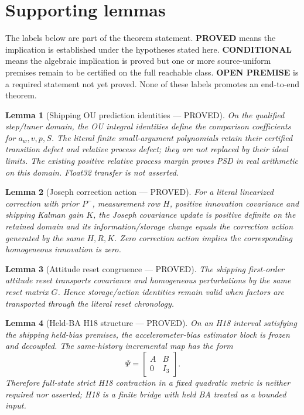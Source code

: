 \documentclass[journal]{IEEEtran}
\newtheorem{lemma}{Lemma}\newtheorem{theorem}{Theorem}\newtheorem{proposition}{Proposition}\newtheorem{remark}{Remark}\newtheorem{corollary}{Corollary}
\begin{document}
\section{Supporting lemmas}
The labels below are part of the theorem statement.  \textbf{PROVED} means the implication is established under the hypotheses stated here. \textbf{CONDITIONAL} means the algebraic implication is proved but one or more source-uniform premises remain to be certified on the full reachable class. \textbf{OPEN PREMISE} is a required statement not yet proved.  None of these labels promotes an end-to-end theorem.

\begin{lemma}[Shipping OU prediction identities --- PROVED]
On the qualified step/tuner domain, the OU integral identities define the comparison coefficients for \(a_w,v,p,S\). The literal finite small-argument polynomials retain their certified transition defect and relative process defect; they are not replaced by their ideal limits. The existing positive relative process margin proves PSD in real arithmetic on this domain. Float32 transfer is not asserted.
\end{lemma}

\begin{lemma}[Joseph correction action --- PROVED]
For a literal linearized correction with prior \(P^-\), measurement row \(H\), positive innovation covariance and shipping Kalman gain \(K\), the Joseph covariance update is positive definite on the retained domain and its information/storage change equals the correction action generated by the same \(H,R,K\).  Zero correction action implies the corresponding homogeneous innovation is zero.
\end{lemma}

\begin{lemma}[Attitude reset congruence --- PROVED]
The shipping first-order attitude reset transports covariance and homogeneous perturbations by the same reset matrix \(G\).  Hence storage/action identities remain valid when factors are transported through the literal reset chronology.
\end{lemma}

\begin{lemma}[Held-BA H18 structure --- PROVED]
On an H18 interval satisfying the shipping held-bias premises, the accelerometer-bias estimator block is frozen and decoupled.  The same-history incremental map has the form
\[
\Psi=\begin{bmatrix}A&B\\0&I_3\end{bmatrix}.
\]
Therefore full-state strict H18 contraction in a fixed quadratic metric is neither required nor asserted; H18 is a finite bridge with held BA treated as a bounded input.
\end{lemma}
\end{document}
